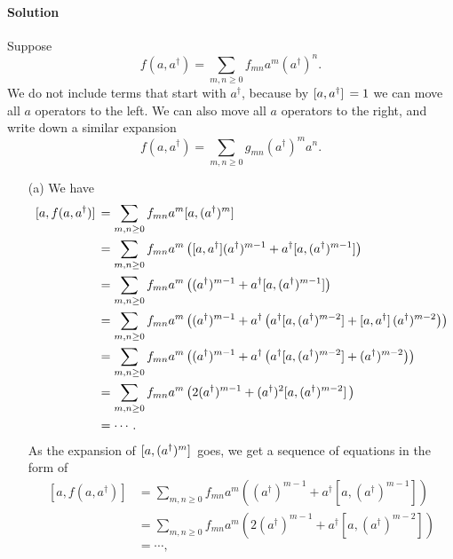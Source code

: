 \documentclass[hyperref, a4paper]{article}
\begin{document}
\paragraph{Solution} Suppose
\begin{equation}
    f(a, a^\dagger) = \sum_{m, n \geq 0} f_{mn} a^m (a^\dagger)^n.
\end{equation}
We do not include terms that start with $a^\dagger$, because by $\comm*{a}{a^\dagger} = 1$ we can move all $a$ operators to the left.
We can also move all $a$ operators to the right, and write down a similar expansion
\begin{equation}
    f(a, a^\dagger) = \sum_{m, n \geq 0} g_{mn} (a^\dagger)^m a^n.
    \label{eq:normal-ordered-general-form}
\end{equation}
\begin{itemize}
\item[(a)] We have \[
    \begin{aligned}
        \comm*{a}{f(a, a^\dagger)} &= \sum_{m, n \geq 0} f_{mn} a^m \comm*{a}{(a^\dagger)^m} \\
        &= \sum_{m, n \geq 0} f_{mn} a^m \left( [a, a^\dagger] (a^\dagger)^{m-1} + a^\dagger [a, (a^\dagger)^{m-1}] \right) \\
        &= \sum_{m, n \geq 0} f_{mn} a^m \left( (a^\dagger)^{m-1} + a^\dagger [a, (a^\dagger)^{m-1}] \right) \\
        &= \sum_{m, n \geq 0} f_{mn} a^m \left( (a^\dagger)^{m-1} + a^\dagger \left( a^\dagger [a, (a^\dagger)^{m-2}] + \comm*{a}{a^\dagger} (a^\dagger)^{m-2} \right) \right) \\
        &= \sum_{m, n \geq 0} f_{mn} a^m \left( (a^\dagger)^{m-1} + a^\dagger \left( a^\dagger [a, (a^\dagger)^{m-2}] + (a^\dagger)^{m-2} \right) \right) \\
        &= \sum_{m, n \geq 0} f_{mn} a^m \left( 2 (a^\dagger)^{m-1} + (a^\dagger)^2 \comm*{a}{(a^\dagger)^{m-2}} \right) \\
        & = \cdots.
    \end{aligned}
\]
As the expansion of $\comm*{a}{(a^\dagger)^{m}}$ goes, we get a sequence of equations in the form of 
\[
    \begin{aligned}
        [a, f(a, a^\dagger)] &= \sum_{m, n \geq 0} f_{mn} a^m \left( (a^\dagger)^{m-1} + a^\dagger [a, (a^\dagger)^{m-1}] \right) \\
        &= \sum_{m, n \geq 0} f_{mn} a^m \left( 2(a^\dagger)^{m-1} + a^\dagger [a, (a^\dagger)^{m-2}] \right) \\
        &= \cdots,

\end{aligned}\]
\end{itemize}
\end{document}
